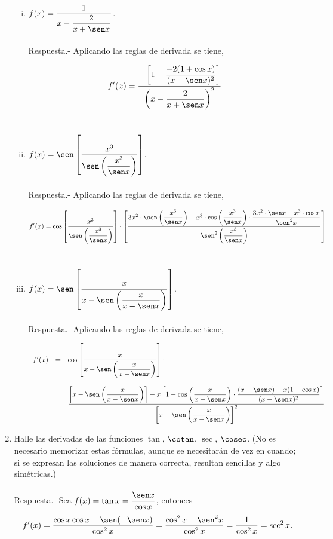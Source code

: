 \begin{enumerate}[\bfseries 1.]
\begin{enumerate}[(i)]
	    \item $f(x)=\dfrac{1}{x-\dfrac{2}{x+\sen x}}$.\\\\

		Respuesta.-\; Aplicando las reglas de derivada se tiene,

		$$f'(x)=\dfrac{-\left[1-\dfrac{-2(1+\cos x)}{(x+\sen x)^2}\right]}{\left(x-\dfrac{2}{x+\sen x}\right)^2}$$\\

	    \item $f(x)=\sen\left[\dfrac{x^3}{\sen\left(\dfrac{x^3}{\sen x}\right)}\right]$.\\\\

		Respuesta.-\; Aplicando las reglas de derivada se tiene,

		$$f'(x)=\cos\left[\dfrac{x^3}{\sen\left(\dfrac{x^3}{\sen x}\right)}\right]\cdot \left[  \dfrac{3x^2\cdot \sen\left(\dfrac{x^3}{\sen x}\right)-x^3\cdot \cos \left(\dfrac{x^3}{\sen x}\right) \cdot \dfrac{3x^2\cdot \sen x - x^3\cdot \cos x}{\sen^2 x}}{\sen^2\left( \dfrac{x^3}{\sen x} \right)} \right].$$\\

	    \item $f(x)=\sen\left[\dfrac{x}{x-\sen\left(\dfrac{x}{x-\sen x}\right)}\right]$.\\\\

		Respuesta.-\; Aplicando las reglas de derivada se tiene,

	    $$\begin{array}{rcl}
		f'(x)&=&\cos\left[\dfrac{x}{x-\sen\left(\dfrac{x}{x-\sen x}\right)}\right]\cdot \\\\
		     && \dfrac{\left[x-\sen\left(\dfrac{x}{x-\sen x}\right)\right]-x\left[1-\cos\left(\dfrac{x}{x-\sen x}\right)\cdot \dfrac{(x-\sen x)-x(1-\cos x)}{(x-\sen x)^2}\right]}{\left[x-\sen\left(\dfrac{x}{x-\sen x}\right)\right]^2}
	    \end{array}$$
	    \vspace{.7cm}

	\end{enumerate}

    \item Halle las derivadas de las funciones $\tan$, $\cotan$, $\sec$, $\cosec$. (No es necesario memorizar estas fórmulas, aunque se necesitarán de vez en cuando; si se expresan las soluciones de manera correcta, resultan sencillas y algo simétricas.)\\\\
	Respuesta.-\; Sea $f(x)=\tan x = \dfrac{\sen x}{\cos x}$, entonces
	$$f'(x)=\dfrac{\cos x \cos x  - \sen (-\sen x)}{\cos^2 x}=\dfrac{\cos^2 x + \sen^2 x}{\cos^2 x}=\dfrac{1}{\cos^2x}=\sec^2 x.$$


\end{enumerate}
